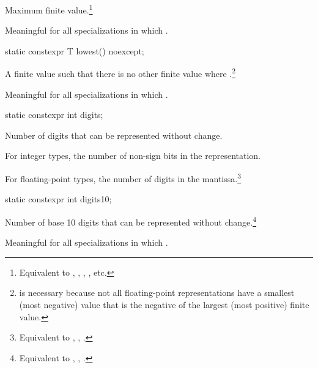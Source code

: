 \begin{itemdescr}
\pnum
Maximum finite value.\footnote{Equivalent to , ,
, , etc.}

\pnum
Meaningful for all specializations in which
.
\end{itemdescr}

%
\begin{itemdecl}
static constexpr T lowest() noexcept;
\end{itemdecl}

\begin{itemdescr}
\pnum
A finite value  such that there is no other finite
value  where .\footnote{ is necessary because not all
floating-point representations have a smallest (most negative) value that is
the negative of the largest (most positive) finite value.}

\pnum
Meaningful for all specializations in which .
\end{itemdescr}

%
\begin{itemdecl}
static constexpr int digits;
\end{itemdecl}

\begin{itemdescr}
\pnum
Number of
digits that can be represented without change.

\pnum
For integer types, the number of non-sign bits in the representation.

\pnum For floating-point types, the number of  digits in the
mantissa.\footnote{Equivalent to , ,
.} \end{itemdescr}

%
\begin{itemdecl}
static constexpr int digits10;
\end{itemdecl}

\begin{itemdescr}
\pnum
Number of base 10 digits that can be represented without
change.\footnote{Equivalent to , ,
.}

\pnum
Meaningful for all specializations in which
.
\end{itemdescr}

